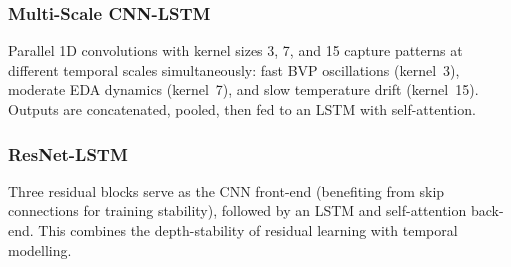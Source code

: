 \documentclass[11pt]{article}
\begin{document}
\subsubsection{Multi-Scale CNN-LSTM}
Parallel 1D convolutions with kernel sizes 3, 7, and 15 capture patterns at different temporal scales simultaneously: fast BVP oscillations (kernel~3), moderate EDA dynamics (kernel~7), and slow temperature drift (kernel~15).
Outputs are concatenated, pooled, then fed to an LSTM with self-attention.

\subsubsection{ResNet-LSTM}
Three residual blocks serve as the CNN front-end (benefiting from skip connections for training stability), followed by an LSTM and self-attention back-end.
This combines the depth-stability of residual learning with temporal modelling.
\end{document}
